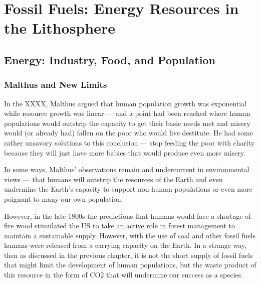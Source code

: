 \chapter{Fossil Fuels: Energy Resources in the Lithosphere\label{ch:fossilfuels}}


\section{Energy: Industry, Food, and Population}

\subsection{Malthus and New Limits}

In the XXXX, Malthus argued that human population growth was exponential while resource growth was linear --- and a point had been reached where human populations would outstrip the capacity to get their basic needs met and misery would (or already had) fallen on the poor who would live destitute. He had some rather unsavory solutions to this conclusion --- stop feeding the poor with charity because they will just have more babies that would produce even more misery. 

In some ways, Malthus' observations remain and undercurrent in environmental views --- that humans will outstrip the resources of the Earth and even undermine the Earth's capacity to support non-human populations or even more poignant to many our own population.


However, in the late 1800s the predictions that humans would face a shortage of fire wood stimulated the US to take an active role in forest management to maintain a sustainable supply. However, with the use of coal and other fossil fuels humans were released from a carrying capacity on the Earth. In a strange way, then as discussed in the previous chapter, it is not the short supply of \gls{fossil fuels} that might limit the development of human populations, but the waste product of this resource in the form of CO2 that will undermine our success as a species. 

